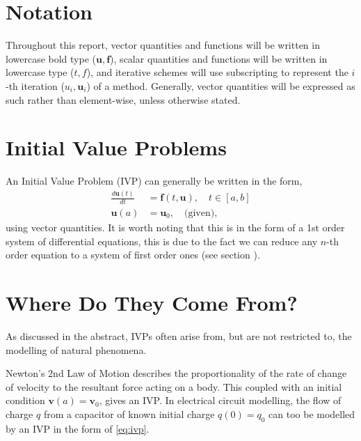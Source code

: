 \documentclass[12pt, twoside]{report}
\theoremstyle{plain}
\theoremstyle{definition}
\begin{document}
    \section{Notation}
    \label{1_notation}
        Throughout this report, vector quantities and functions will be written
        in lowercase bold type ($\mathbf{u}, \mathbf{f}$), scalar quantities 
        and functions will be written in lowercase type ($t, f$), and iterative
        schemes will use subscripting to represent the $i$-th iteration 
        ($u_{i}, \mathbf{u}_i$) of a method. Generally, vector quantities will
        be expressed as such rather than element-wise, unless otherwise stated.


    \section{Initial Value Problems}
    \label{1_notation}
        An Initial Value Problem (IVP) can generally be written in the form,
        \begin{equation}
        \label{eq:ivp}
            \begin{split}
                \frac{d \mathbf{u}(t)}{dt}& = \mathbf{f}(t, \mathbf{u}), 
                \quad t \in [a, b]\\
                \mathbf{u}(a)& = \mathbf{u}_0, \quad \text{(given)},
            \end{split}
        \end{equation}
        using vector quantities. It is worth noting that this is in the form of
        a 1st order system of differential equations, this is due to the fact 
        we can reduce any $n$-th order equation to a system of first order ones
        (see section ).


    \section{Where Do They Come From?}
    \label{1_notation}
        As discussed in the abstract, IVPs often arise from, but are not
        restricted to, the modelling of natural phenomena. 

        Newton's 2nd Law of Motion describes the proportionality of the rate 
        of change of velocity to the resultant force acting on a body. This 
        coupled with an initial condition $\mathbf{v}(a)=\mathbf{v}_0$, gives
        an IVP. In electrical circuit modelling, the flow of charge $q$ from a
        capacitor of known initial charge $q(0)=q_0$ can too be modelled by an 
        IVP in the form of \eqref{eq:ivp}.
\end{document}
